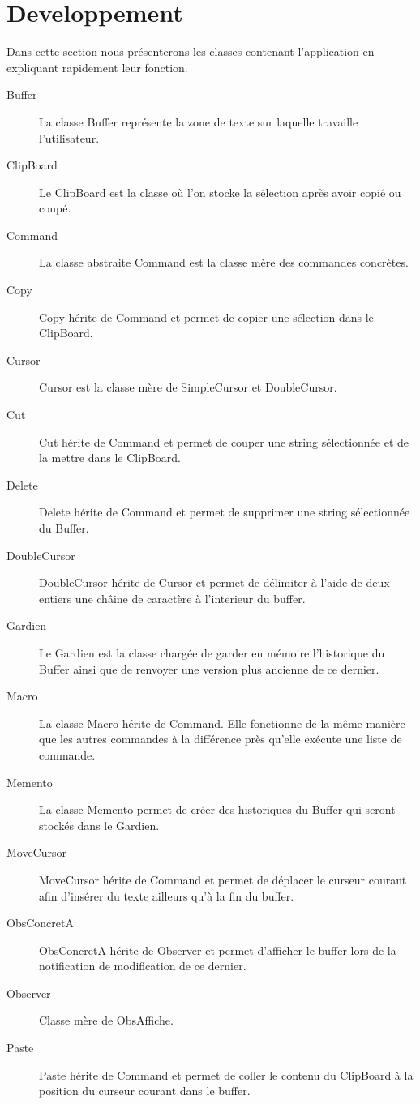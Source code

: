 \documentclass[11pt,a4paper,oldfontcommands]{memoir}
\begin{document}
\chapter{Developpement}
Dans cette section nous présenterons les classes contenant l'application en expliquant rapidement leur fonction.\\
\begin{description}
  \item[Buffer] La classe Buffer représente la zone de texte sur laquelle travaille l'utilisateur.
  \item[ClipBoard] Le ClipBoard est la classe où l'on stocke la sélection après avoir copié ou coupé.
  \item[Command] La classe abstraite Command est la classe mère des commandes concrètes.
  \item[Copy] Copy hérite de Command et permet de copier une sélection dans le ClipBoard.
  \item[Cursor] Cursor est la classe mère de SimpleCursor et DoubleCursor.
  \item[Cut] Cut hérite de Command et permet de couper une string sélectionnée et de la mettre dans le ClipBoard.
  \item[Delete] Delete hérite de Command et permet de supprimer une string sélectionnée du Buffer.
  \item[DoubleCursor] DoubleCursor hérite de Cursor et permet de délimiter à l'aide de deux entiers une châine de caractère à l'interieur du buffer.
  \item[Gardien] Le Gardien est la classe chargée de garder en mémoire l'historique du Buffer ainsi que de renvoyer une version plus ancienne de ce dernier.
  \item[Macro] La classe Macro hérite de Command. Elle fonctionne de la même manière que les autres commandes à la différence près qu'elle exécute une liste de commande.
  \item[Memento] La classe Memento permet de créer des historiques du Buffer qui seront stockés dans le Gardien.
  \item[MoveCursor] MoveCursor hérite de Command et permet de déplacer le curseur courant afin d'insérer du texte ailleurs qu'à la fin du buffer.
  \item[ObsConcretA] ObsConcretA hérite de Observer et permet d'afficher le buffer lors de la notification de modification de ce dernier.
  \item[Observer] Classe mère de ObsAffiche.
  \item[Paste] Paste hérite de Command et permet de coller le contenu du ClipBoard à la position du curseur courant dans le buffer.

\end{description}
\end{document}

